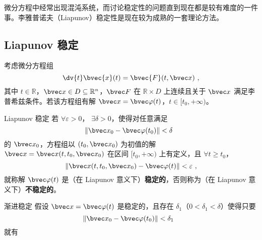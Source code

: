 
\begin{issues}
\issueMissDepend
\end{issues}

微分方程中经常出现混沌系统，而讨论稳定性的问题直到现在都是较有难度的一件事。李雅普诺夫（Liapunov）稳定性是现在较为成熟的一套理论方法。

\subsection{Liapunov 稳定}
考虑微分方程组 
\begin{equation}
\dv{t} \bvec{x}(t) = \bvec{F}(t, \bvec x) ~,
\end{equation}
其中 $t \in \mathbb R$，$\bvec x \in D \subseteq \mathbb R^n$，$\bvec F$ 在 $\mathbb R \times D$ 上连续且关于 $\bvec x$ 满足李普希兹条件。若该方程组有解 $\bvec x = \bvec \varphi(t)$，$t \in [t_0, +\infty)$。

\begin{definition}{Liapunov 稳定}
若 $\forall \varepsilon > 0$， $\exists \delta > 0$，使得对任意满足 
\begin{equation}
\Vert \bvec x_0 - \bvec \varphi(t_0)\Vert < \delta ~~
\end{equation}
的 $\bvec x_0$，方程组以 $(t_0, \bvec x_0)$ 为初值的解 $\bvec x= \bvec x(t, t_0, \bvec x_0)$ 在区间 $[t_0, +\infty)$ 上有定义，且 $\forall t \ge t_0$，
\begin{equation}
\Vert  \bvec x(t, t_0, \bvec x_0) - \bvec \varphi(t) \Vert < \varepsilon ~,
\end{equation}
就称解 $\bvec \varphi(t)$ 是（在 Liapunov 意义下）\textbf{稳定的}，否则称为（在 Liapunov 意义下）\textbf{不稳定的}。

\end{definition}

\begin{definition}{渐进稳定}
假设 $\bvec x = \bvec \varphi(t)$ 是稳定的，且存在 $\delta_1$（$0 < \delta_1 < \delta$）使得只要
\begin{equation}
\Vert \bvec x_0 - \bvec \varphi(t_0) \Vert < \delta_1 ~~
\end{equation}
就有

\end{definition}


